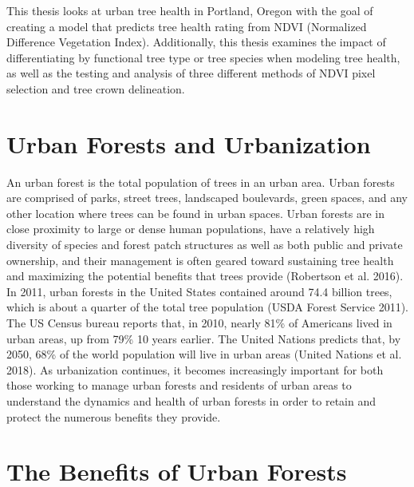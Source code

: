 \documentclass[12pt,twoside]{reedthesis}
\begin{document}
This thesis looks at urban tree health in Portland, Oregon with the goal
of creating a model that predicts tree health rating from NDVI
(Normalized Difference Vegetation Index). Additionally, this thesis
examines the impact of differentiating by functional tree type or tree
species when modeling tree health, as well as the testing and analysis
of three different methods of NDVI pixel selection and tree crown
delineation.

\hypertarget{urban-forests-and-urbanization}{%
\section{Urban Forests and Urbanization}\label{urban-forests-and-urbanization}}

An urban forest is the total population of trees in an urban area. Urban
forests are comprised of parks, street trees, landscaped boulevards,
green spaces, and any other location where trees can be found in urban
spaces. Urban forests are in close proximity to large or dense human
populations, have a relatively high diversity of species and forest
patch structures as well as both public and private ownership, and their
management is often geared toward sustaining tree health and maximizing
the potential benefits that trees provide (Robertson et al. 2016). In 2011,
urban forests in the United States contained around 74.4 billion trees,
which is about a quarter of the total tree population
(USDA Forest Service 2011). The US Census bureau reports that, in 2010,
nearly 81\% of Americans lived in urban areas, up from 79\% 10 years
earlier. The United Nations predicts that, by 2050, 68\% of the world
population will live in urban areas (United Nations et al. 2018). As
urbanization continues, it becomes increasingly important for both those
working to manage urban forests and residents of urban areas to
understand the dynamics and health of urban forests in order to retain
and protect the numerous benefits they provide.

\hypertarget{the-benefits-of-urban-forests}{%
\section{The Benefits of Urban Forests}\label{the-benefits-of-urban-forests}}
\end{document}
